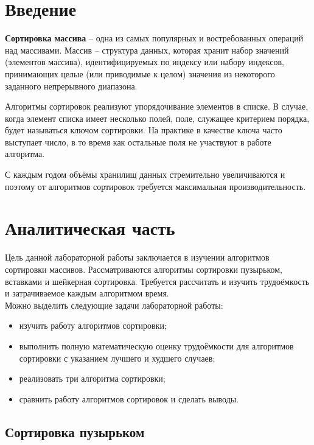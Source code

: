 \documentclass[12pt,a4paper]{report}
\begin{document}

\tableofcontents

\newpage
\chapter*{Введение}

\textbf{Сортировка массива} -- одна из самых популярных и востребованных операций над массивами.
Массив -- структура данных, которая хранит набор значений (элементов массива), идентифицируемых по индексу или набору 
индексов, принимающих целые (или приводимые к целом) значения из некоторого заданного непрерывного диапазона.

Алгоритмы сортировок реализуют упорядочивание элементов в списке. В случае, когда элемент списка имеет несколько 
полей, поле, служащее критерием порядка, будет называться ключом сортировки. 
На практике в качестве ключа часто выступает число, в то время как остальные поля не участвуют в работе алгоритма.

С каждым годом объёмы хранилищ данных стремительно увеличиваются и поэтому от алгоритмов сортировок требуется 
максимальная производительность.

\newpage
\chapter{Аналитическая часть}

Цель данной лабораторной работы заключается в изучении алгоритмов сортировки массивов. 
Рассматриваются алгоритмы сортировки пузырьком, вставками и шейкерная сортировка. 
Требуется рассчитать и изучить трудоёмкость и затрачиваемое каждым алгоритмом время. \\

Можно выделить следующие задачи лабораторной работы:
\begin{itemize}
    \item изучить работу алгоритмов сортировки;
    \item выполнить полную математическую оценку трудоёмкости для алгоритмов сортировки с указанием лучшего и худшего случаев;
    \item реализовать три алгоритма сортировки;
    \item сравнить работу алгоритмов сортировок и сделать выводы.  
\end{itemize}

\section{Сортировка пузырьком}
\end{document}
